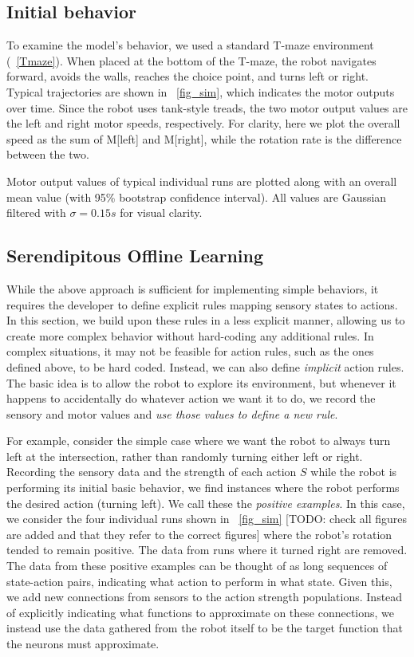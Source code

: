 \documentclass[conference]{IEEEtran}
\begin{document}
\subsection{Initial behavior}

To examine the model's behavior, we used a standard T-maze
environment (\figurename~\ref{Tmaze}). When placed at the bottom
of the T-maze, the robot navigates forward, avoids the
walls, reaches the choice point, and turns left or right.
Typical trajectories are shown in \figurename~\ref{fig_sim}, which indicates the motor outputs over time. Since the robot uses tank-style treads, the two motor output values are the left and right motor speeds, respectively. For clarity, here we plot the overall speed as the sum of M[left] and M[right], while the rotation rate is the difference between the two. 



Motor output values of typical individual runs are plotted along with an overall mean value (with 95\% bootstrap confidence interval). All values are Gaussian filtered with $\sigma=0.15s$ for visual clarity.


\subsection{Serendipitous Offline Learning}

While the above approach is sufficient for implementing simple behaviors, it requires the developer to define explicit rules mapping sensory states to actions. In this section, we build upon these
rules in a less explicit manner, allowing us to create more complex behavior
without hard-coding any additional rules.  In complex situations, it may not be 
feasible for action rules, such as the ones defined above, to be hard coded. Instead,
we can also define \textit{implicit} action rules. The basic idea is to allow
the robot to explore its environment, but whenever it happens to accidentally
do whatever action we want it to do, we record the sensory and motor 
values and \textit{use those values to define a new rule}.

For example, consider the simple case where we want the robot to always turn left at 
the intersection, rather than randomly turning either left or right. Recording 
the sensory data and the strength of each action $S$ while the robot is 
performing its initial basic behavior, we find instances where the robot 
performs the desired action (turning left). We call these the \textit{positive 
examples}. In this case, we consider the four individual runs shown in \figurename~\ref{fig_sim} [TODO: check all figures are added and that they refer to the correct figures] where the robot's rotation tended to remain positive.  The data from runs where it turned right are removed.  The data from these positive examples can 
be thought of as long sequences of state-action pairs, indicating what action 
to perform in what state. Given this, we add new connections from sensors to 
the action strength populations. Instead of explicitly indicating what functions 
to approximate on these connections, we instead use the data gathered from
the robot itself to be the target function that the neurons must approximate.
\end{document}
